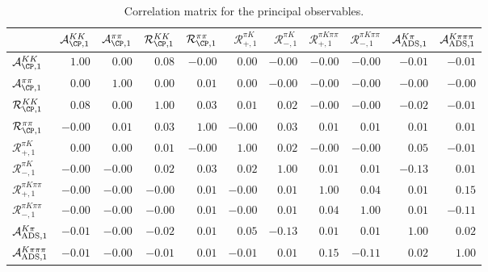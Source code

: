 \begin{table}
\centering
\caption{Correlation matrix for the principal observables.}
\begin{tabular}{l|rrrrrrrrrr}
& $\mathcal{A}_{\CP,1}^{KK}$& $\mathcal{A}_{\CP,1}^{\pi\pi}$& $\mathcal{R}_{\CP,1}^{KK}$& $\mathcal{R}_{\CP,1}^{\pi\pi}$& $\mathcal{R}_{+,1}^{\pi K}$& $\mathcal{R}_{-,1}^{\pi K}$& $\mathcal{R}_{+,1}^{\pi K\pi\pi}$& $\mathcal{R}_{-,1}^{\pi K\pi\pi}$& $\mathcal{A}_{\rm ADS,1}^{K\pi}$& $\mathcal{A}_{\rm ADS,1}^{K\pi\pi\pi}$ \\
\midrule

$\mathcal{A}_{\CP,1}^{KK}$ & $1.00$ & $0.00$ & $0.08$ & $-0.00$ & $0.00$ & $-0.00$ & $-0.00$ & $-0.00$ & $-0.01$ & $-0.01$ \\

$\mathcal{A}_{\CP,1}^{\pi\pi}$ & $0.00$ & $1.00$ & $0.00$ & $0.01$ & $0.00$ & $-0.00$ & $-0.00$ & $-0.00$ & $-0.00$ & $-0.00$ \\

$\mathcal{R}_{\CP,1}^{KK}$ & $0.08$ & $0.00$ & $1.00$ & $0.03$ & $0.01$ & $0.02$ & $-0.00$ & $-0.00$ & $-0.02$ & $-0.01$ \\

$\mathcal{R}_{\CP,1}^{\pi\pi}$ & $-0.00$ & $0.01$ & $0.03$ & $1.00$ & $-0.00$ & $0.03$ & $0.01$ & $0.01$ & $0.01$ & $0.01$ \\

$\mathcal{R}_{+,1}^{\pi K}$ & $0.00$ & $0.00$ & $0.01$ & $-0.00$ & $1.00$ & $0.02$ & $-0.00$ & $-0.00$ & $0.05$ & $-0.01$ \\

$\mathcal{R}_{-,1}^{\pi K}$ & $-0.00$ & $-0.00$ & $0.02$ & $0.03$ & $0.02$ & $1.00$ & $0.01$ & $0.01$ & $-0.13$ & $0.01$ \\

$\mathcal{R}_{+,1}^{\pi K\pi\pi}$ & $-0.00$ & $-0.00$ & $-0.00$ & $0.01$ & $-0.00$ & $0.01$ & $1.00$ & $0.04$ & $0.01$ & $0.15$ \\

$\mathcal{R}_{-,1}^{\pi K\pi\pi}$ & $-0.00$ & $-0.00$ & $-0.00$ & $0.01$ & $-0.00$ & $0.01$ & $0.04$ & $1.00$ & $0.01$ & $-0.11$ \\

$\mathcal{A}_{\rm ADS,1}^{K\pi}$ & $-0.01$ & $-0.00$ & $-0.02$ & $0.01$ & $0.05$ & $-0.13$ & $0.01$ & $0.01$ & $1.00$ & $0.02$ \\

$\mathcal{A}_{\rm ADS,1}^{K\pi\pi\pi}$ & $-0.01$ & $-0.00$ & $-0.01$ & $0.01$ & $-0.01$ & $0.01$ & $0.15$ & $-0.11$ & $0.02$ & $1.00$ \\
\end{tabular}
\label{tab:correlation_1v1}
\end{table}
